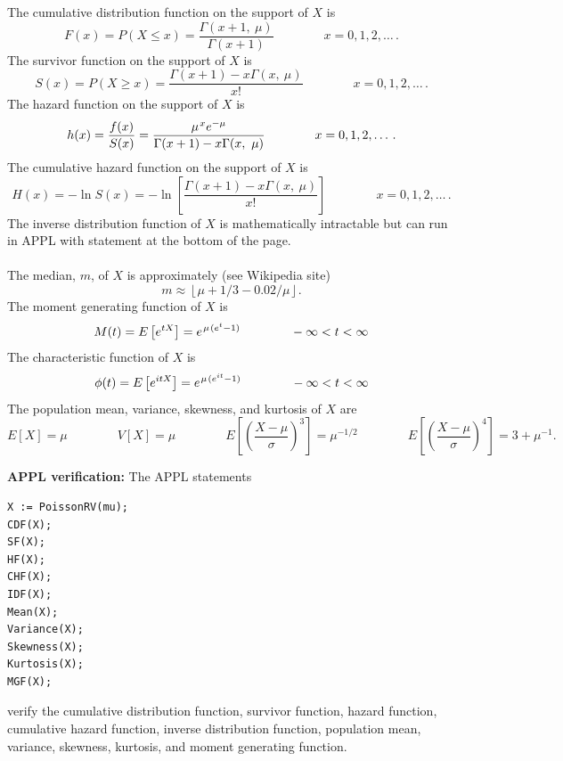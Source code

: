 \documentclass[12pt,fullpage]{article}
\begin{document}
\noindent
The cumulative distribution function on
the support of $X$ is
$$
F(x) = P(X \le x) = \frac{\Gamma(x + 1,\  \mu)}{\Gamma(x + 1)} \qquad \qquad x = 0,1,2 , \ldots \,.
$$
The survivor function on the support of $X$ is
$$
S(x) = P(X \ge x) = \frac{\Gamma(x + 1) - x \Gamma(x,\ \mu)}{x!} \qquad \qquad x = 0,1,2 , \ldots \,.
$$
The hazard function on the support of $X$ is
$$
h(x) = \frac{f(x)} {S(x)} = \frac{\mu ^ {\kern 0.08 em x} e ^ {-\mu}}{\Gamma(x + 1) - x \Gamma(x,\  \mu)} \qquad \qquad x = 0,1,2 , \ldots \,.
$$
The cumulative hazard function on the support of $X$ is
$$
H(x) = - \ln S(x) = -\ln \left[ \frac{\Gamma(x+1) - x \Gamma(x,\  \mu)}{x!} \right] \qquad \qquad x = 0,1,2 , \ldots \,.
$$
The inverse distribution function of $X$ is mathematically intractable but can run in APPL with statement at the bottom of the page.\\
\\
The median, $m$, of $X$ is approximately (see Wikipedia site)
$$
m \approx \left\lfloor \mu + 1 / 3 - 0.02/ \mu \right\rfloor.
$$
The moment generating function of $X$ is
$$
M(t) = E\left[ e ^ {tX} \right] = e ^ {\kern 0.08em \mu \kern 0.08 em (e ^ t - 1)} \qquad \qquad - \infty < t < \infty
$$
The characteristic function of $X$ is
$$
\phi(t) = E\left[ e ^ {itX} \right] =  e^{\kern 0.08em \mu\kern 0.08 em (e^{it} -1)} \qquad \qquad - \infty < t < \infty
$$
The population mean, variance, skewness, and kurtosis of $X$ are
$$
E[X] = \mu \qquad \qquad 
V[X] = \mu \qquad \qquad 
E\left[ \left( \frac{X - \mu}{\sigma} \right) ^ 3 \right] = \mu ^{-1/2} \qquad \qquad
E\left[ \left( \frac{X - \mu}{\sigma} \right) ^ 4 \right] = 3 + \mu ^{-1}.
$$

\vspace{0.1in}

\noindent
{\bf APPL verification:}
The APPL statements
\begin{verbatim}
X := PoissonRV(mu);
CDF(X);
SF(X);
HF(X);
CHF(X);
IDF(X);
Mean(X);
Variance(X);
Skewness(X);
Kurtosis(X);
MGF(X);
\end{verbatim}
verify the cumulative distribution function, survivor function, hazard function, cumulative hazard function,  inverse distribution function, population mean, variance, skewness, kurtosis, and moment generating function.
\end{document}
